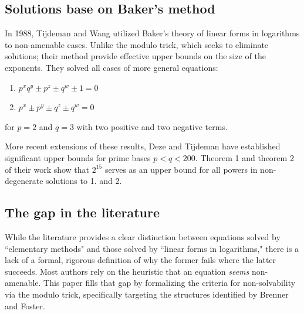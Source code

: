 \documentclass[12pt]{article}
\begin{document}
\subsection*{Solutions base on Baker's method}
\hspace*{0.5cm}  In 1988, Tijdeman and Wang \cite{wang} utilized Baker's theory of linear forms in logarithms to non-amenable cases. Unlike the modulo trick, which seeks to eliminate solutions; their method provide effective upper bounds on the size of the exponents. They solved all cases of more general equations:
\begin{enumerate}
    \item $p^x q^y \pm p^z \pm q^w \pm 1 = 0$
    \item $p^x \pm p^y \pm q^z \pm q^w = 0$
\end{enumerate}
for $p=2$ and $q=3$ with two positive and two negative terms.


\hspace*{0.5cm} More recent extensions of these results, Deze and Tijdeman \cite{DEZE199247} have established significant upper bounds for prime bases $p < q < 200$. Theorem 1 and theorem 2 of their work show that $2^{15}$ serves as an upper bound for all powers in non-degenerate solutions to 1. and 2.


\subsection*{The gap in the literature}
\hspace*{0.5cm} While the literature provides a clear distinction between equations solved by ``elementary methods" and those solved by ``linear forms in logarithms," there is a lack of a formal, rigorous definition of why the former fails where the latter succeeds. Most authors rely on the heuristic that an equation \textit{seems} non-amenable. This paper fills that gap by formalizing the criteria for non-solvability via the modulo trick, specifically targeting the structures identified by Brenner and Foster.
\end{document}
